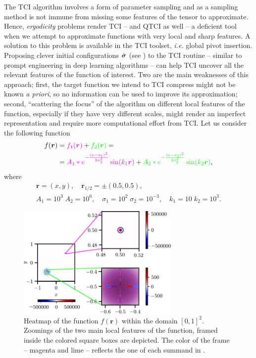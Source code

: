 The TCI algorithm involves a form of parameter sampling and as a sampling method is not immune from missing some features of the tensor to approximate. Hence, \textit{ergodicity} problems render TCI -- and QTCI as well -- a deficient tool when we attempt to approximate functions with very local and sharp features. 
A solution to this problem is available in the TCI toolset, \emph{i.e.} global pivot insertion. Proposing clever initial configurations $\hat{\boldsymbol{\sigma}}$ (see ) to the TCI routine -- similar to prompt engineering in deep learning algorithms -- can help TCI uncover all the relevant features of the function of interest. Two are the main weaknesses of this approach; first, the target function we intend to TCI compress might not be known \emph{a priori}, so no information can be used to improve its approximation; second, ``scattering the focus'' of the algorithm on different local features of the function, especially if they have very different scales, might render an imperfect representation and require more computational effort from TCI. 
Let us consider the following function 
\begin{gather}
	\begin{aligned}
		f(\boldsymbol{r}) &={\color{mymagenta}f_1(\boldsymbol{r})} + {\color{green} f_2(\boldsymbol{r})} =\\ 
		&={\color{mymagenta} A_1 * e^{-\frac{(\boldsymbol{r} - \boldsymbol{r}_1)^2}{2\sigma^2_1}} \sin(k_1\boldsymbol{r})} + {\color{green} A_2 * e^{-\frac{(\boldsymbol{r} - \boldsymbol{r}_2)^2}{2\sigma^2_2}} \sin(k_2\boldsymbol{r})},
	\end{aligned}
\end{gather}
	where
\[
\begin{gathered}
	\boldsymbol{r} = (x,y), \quad \boldsymbol{r}_{1/2} = \pm( 0.5, 0.5),\\[6pt]
	A_1 = 10^{3}\; A_2 = 10^6, \quad \sigma_1 = 10^{2}\; \sigma_2 = 10^{-3}, \quad k_1 = 10\; k_2 = 10^3. 
	\label{eq:localFunc}
\end{gathered}
\]
\begin{figure}[ht!]
	\centering
	\includegraphics[width=0.7\textwidth]{figures/Heatmap_localised_func.pdf}
	\caption{Heatmap of the function $f(\boldsymbol{r})$ within the domain $[0,1]^2$. Zoomings of the two main local features of the function, framed inside the colored square boxes are depicted. The color of the frame  -- {\color{mymagenta} magenta} and {\color{green} lime} -- reflects the one of each summand in .}
	\label{fig:localFunc}
\end{figure}

